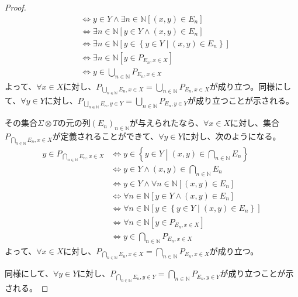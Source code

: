 \documentclass[dvipdfmx]{jsarticle}
\begin{document}
\begin{proof}
\begin{align*}
&\Leftrightarrow y \in Y \land \exists n \in \mathbb{N}\left[ (x,y) \in E_{n} \right]\\
&\Leftrightarrow \exists n \in \mathbb{N}\left[ y \in Y \land (x,y) \in E_{n} \right]\\
&\Leftrightarrow \exists n \in \mathbb{N}\left[ y \in \left\{ y \in Y \middle| (x,y) \in E_{n} \right\} \right]\\
&\Leftrightarrow \exists n \in \mathbb{N}\left[ y \in P_{E_{n},x \in X} \right]\\
&\Leftrightarrow y \in \bigcup_{n \in \mathbb{N}} P_{E_{n},x \in X}
\end{align*}
よって、$\forall x \in X$に対し、$P_{\bigcup_{n \in \mathbb{N}} E_{n},x \in X} = \bigcup_{n \in \mathbb{N}} P_{E_{n},x \in X}$が成り立つ。同様にして、$\forall y \in Y$に対し、$P_{\bigcup_{n \in \mathbb{N}} E_{n},y \in Y} = \bigcup_{n \in \mathbb{N}} P_{E_{n},y \in Y}$が成り立つことが示される。\par
その集合$\varSigma \otimes T$の元の列$\left( E_{n} \right)_{n \in \mathbb{N}}$が与えられたなら、$\forall x \in X$に対し、集合$P_{\bigcap_{n \in \mathbb{N}} E_{n},x \in X}$が定義されることができて、$\forall y \in Y$に対し、次のようになる。
\begin{align*}
y \in P_{\bigcap_{n \in \mathbb{N}} E_{n},x \in X} &\Leftrightarrow y \in \left\{ y \in Y \middle| (x,y) \in \bigcap_{n \in \mathbb{N}} E_{n} \right\}\\
&\Leftrightarrow y \in Y \land (x,y) \in \bigcap_{n \in \mathbb{N}} E_{n}\\
&\Leftrightarrow y \in Y \land \forall n \in \mathbb{N}\left[ (x,y) \in E_{n} \right]\\
&\Leftrightarrow \forall n \in \mathbb{N}\left[ y \in Y \land (x,y) \in E_{n} \right]\\
&\Leftrightarrow \forall n \in \mathbb{N}\left[ y \in \left\{ y \in Y \middle| (x,y) \in E_{n} \right\} \right]\\
&\Leftrightarrow \forall n \in \mathbb{N}\left[ y \in P_{E_{n},x \in X} \right]\\
&\Leftrightarrow y \in \bigcap_{n \in \mathbb{N}} P_{E_{n},x \in X}
\end{align*}
よって、$\forall x \in X$に対し、$P_{\bigcap_{n \in \mathbb{N}} E_{n},x \in X} = \bigcap_{n \in \mathbb{N}} P_{E_{n},x \in X}$が成り立つ。\par
同様にして、$\forall y \in Y$に対し、$P_{\bigcap_{n \in \mathbb{N}} E_{n},y \in Y} = \bigcap_{n \in \mathbb{N}} P_{E_{n},y \in Y}$が成り立つことが示される。
\end{proof}
\end{document}
